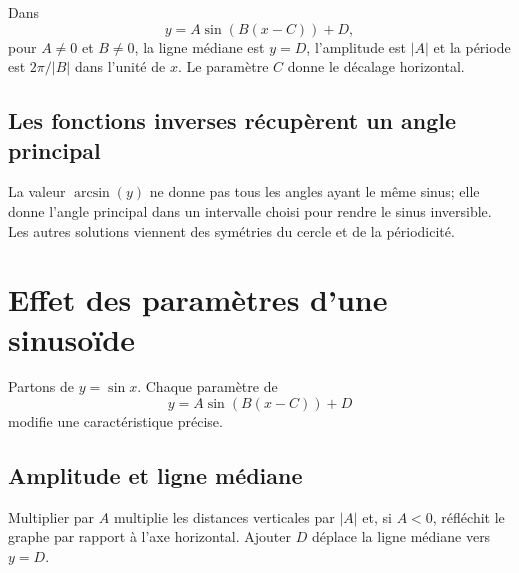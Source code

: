 \begin{connectionbox}
Dans
\[
y=A\sin(B(x-C))+D,
\]
pour $A\ne0$ et $B\ne0$, la ligne médiane est $y=D$, l'amplitude est $|A|$ et la période est $2\pi/|B|$ dans l'unité de $x$. Le paramètre $C$ donne le décalage horizontal.
\end{connectionbox}

\subsection{Les fonctions inverses récupèrent un angle principal}
La valeur $\arcsin(y)$ ne donne pas tous les angles ayant le même sinus; elle donne l'angle principal dans un intervalle choisi pour rendre le sinus inversible. Les autres solutions viennent des symétries du cercle et de la périodicité.


\section{Effet des paramètres d'une sinusoïde}
\label{manual:section:16.06}

Partons de $y=\sin x$. Chaque paramètre de
\[
y=A\sin(B(x-C))+D
\]
modifie une caractéristique précise.

\subsection{Amplitude et ligne médiane}
Multiplier par $A$ multiplie les distances verticales par $|A|$ et, si $A<0$, réfléchit le graphe par rapport à l'axe horizontal. Ajouter $D$ déplace la ligne médiane vers $y=D$.

\begin{center}
\qquad
{}
\end{center}


